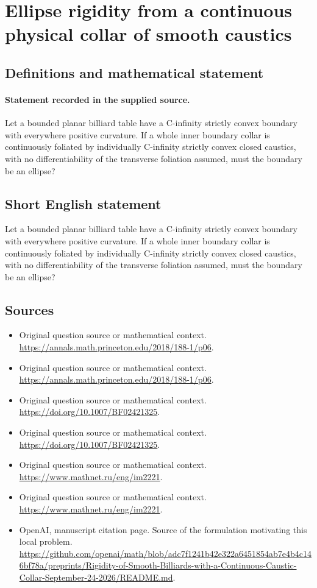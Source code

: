 \documentclass[11pt]{article}
\begin{document}
\section*{Ellipse rigidity from a continuous physical collar of smooth caustics}\label{30007173}
\subsection{Definitions and mathematical statement}
\paragraph{Statement recorded in the supplied source.}
Let a bounded planar billiard table have a C-infinity strictly convex boundary with everywhere positive curvature. If a whole inner boundary collar is continuously foliated by individually C-infinity strictly convex closed caustics, with no differentiability of the transverse foliation assumed, must the boundary be an ellipse?
\subsection{Short English statement}
Let a bounded planar billiard table have a C-infinity strictly convex boundary with everywhere positive curvature. If a whole inner boundary collar is continuously foliated by individually C-infinity strictly convex closed caustics, with no differentiability of the transverse foliation assumed, must the boundary be an ellipse?
\subsection{Sources}
\begin{itemize}
\item[S1] Original question source or mathematical context.
\url{https://annals.math.princeton.edu/2018/188-1/p06}.
\item[S2] Original question source or mathematical context.
\url{https://annals.math.princeton.edu/2018/188-1/p06}.
\item[S3] Original question source or mathematical context.
\url{https://doi.org/10.1007/BF02421325}.
\item[S4] Original question source or mathematical context.
\url{https://doi.org/10.1007/BF02421325}.
\item[S5] Original question source or mathematical context.
\url{https://www.mathnet.ru/eng/im2221}.
\item[S6] Original question source or mathematical context.
\url{https://www.mathnet.ru/eng/im2221}.
\item[S7] OpenAI, manuscript citation page. Source of the formulation motivating this local problem.
\url{https://github.com/openai/math/blob/adc7f1241b42e322a6451854ab7e4b4c146bf78a/preprints/Rigidity-of-Smooth-Billiards-with-a-Continuous-Caustic-Collar-September-24-2026/README.md}.
\end{itemize}
\end{document}
